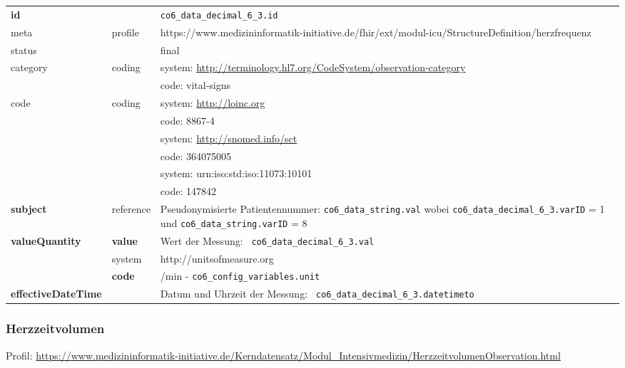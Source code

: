 \begin{longtable}{|l|l|p{7.5cm}|}
        \hline
        \rowcolor{lightgray} \multicolumn{3}{|l|}{Data Mapping (inhaltlich)} \\ \hline
        \textbf{id} &  & \texttt{co6\_data\_decimal\_6\_3.id} \\ \hline
	meta & profile & https://www.medizininformatik-initiative.de/fhir/ext/modul-icu/StructureDefinition/herzfrequenz \\ \hline 
	status &  & final   \\ \hline 
	category & coding & system: \url{http://terminology.hl7.org/CodeSystem/observation-category} \\
\cline{3-3}
	& & code: vital-signs\\ \hline
	code & coding & system: \url{http://loinc.org} \\ 
	\cline{3-3} 
	&  & code: 8867-4 \\ 
	\cline{3-3} 
	&  & system: \url{http://snomed.info/sct} \\ 
	\cline{3-3} 
	&  & code: 364075005 \\ 
	\cline{3-3} 
	&  & system: urn:iso:std:iso:11073:10101 \\ 
	\cline{3-3}
	&  & code: 147842 \\ \hline
	 \textbf{subject} & reference & Pseudonymisierte Patientennummer: \texttt{co6\_data\_string.val} wobei \texttt{co6\_data\_decimal\_6\_3.varID} = 1 und \texttt{co6\_data\_string.varID} = 8 \\ \hline
	 \textbf{valueQuantity}  & \textbf{value} & Wert der Messung: \texttt{
co6\_data\_decimal\_6\_3.val} \\
        \cline{2-3}
         & system & http://unitsofmeasure.org \\
         \cline{2-3}
         & \textbf{code} & /min - \texttt{co6\_config\_variables.unit} \\ \hline
     \textbf{effectiveDateTime}  & & Datum und Uhrzeit der Messung: \texttt{
co6\_data\_decimal\_6\_3.datetimeto} \\ \hline
\end{longtable}

\subsubsection{Herzzeitvolumen} 

Profil: \url{https://www.medizininformatik-initiative.de/Kerndatensatz/Modul_Intensivmedizin/HerzzeitvolumenObservation.html}

